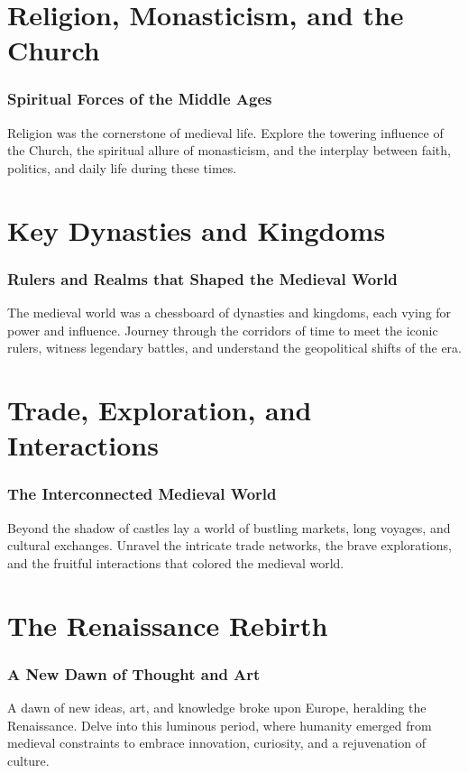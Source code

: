 \documentclass[a4paper,12pt]{book}
\begin{document}
\chapter{Religion, Monasticism, and the Church}
\subsection*{Spiritual Forces of the Middle Ages}
Religion was the cornerstone of medieval life. Explore the towering influence of the Church, the spiritual allure of monasticism, and the interplay between faith, politics, and daily life during these times.

\chapter{Key Dynasties and Kingdoms}
\subsection*{Rulers and Realms that Shaped the Medieval World}
The medieval world was a chessboard of dynasties and kingdoms, each vying for power and influence. Journey through the corridors of time to meet the iconic rulers, witness legendary battles, and understand the geopolitical shifts of the era.

\chapter{Trade, Exploration, and Interactions}
\subsection*{The Interconnected Medieval World}
Beyond the shadow of castles lay a world of bustling markets, long voyages, and cultural exchanges. Unravel the intricate trade networks, the brave explorations, and the fruitful interactions that colored the medieval world.

\chapter{The Renaissance Rebirth}
\subsection*{A New Dawn of Thought and Art}
A dawn of new ideas, art, and knowledge broke upon Europe, heralding the Renaissance. Delve into this luminous period, where humanity emerged from medieval constraints to embrace innovation, curiosity, and a rejuvenation of culture.
\end{document}
